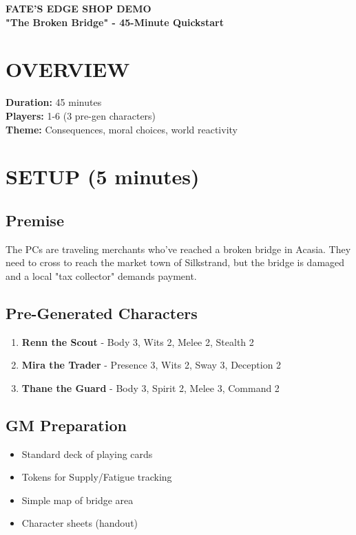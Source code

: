 \documentclass[11pt]{article}
\begin{document}
\begin{center}
{\LARGE \textbf{FATE'S EDGE SHOP DEMO}} \\
{\large \textbf{"The Broken Bridge" - 45-Minute Quickstart}}
\end{center}

\section*{OVERVIEW}

\textbf{Duration:} 45 minutes \\
\textbf{Players:} 1-6 (3 pre-gen characters) \\
\textbf{Theme:} Consequences, moral choices, world reactivity

\section{SETUP (5 minutes)}

\subsection*{Premise}
The PCs are traveling merchants who've reached a broken bridge in Acasia. They need to cross to reach the market town of Silkstrand, but the bridge is damaged and a local "tax collector" demands payment.

\subsection*{Pre-Generated Characters}
\begin{enumerate}
\item \textbf{Renn the Scout} - Body 3, Wits 2, Melee 2, Stealth 2
\item \textbf{Mira the Trader} - Presence 3, Wits 2, Sway 3, Deception 2
\item \textbf{Thane the Guard} - Body 3, Spirit 2, Melee 3, Command 2
\end{enumerate}

\subsection*{GM Preparation}
\begin{itemize}
\item Standard deck of playing cards
\item Tokens for Supply/Fatigue tracking
\item Simple map of bridge area
\item Character sheets (handout)
\end{itemize}
\end{document}
